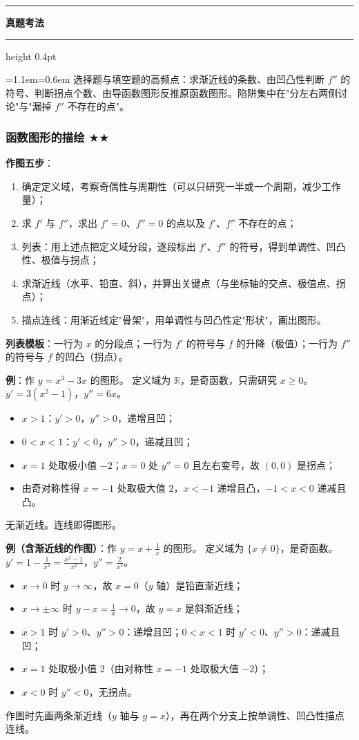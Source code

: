 \documentclass[11pt,openany,UTF8]{ctexbook}
\newcommand{\callouthead}[2]{%
  \par\addvspace{7pt}\noindent
  {\color{#1}\rule[-0.15em]{3pt}{1.05em}}\hspace{0.5em}%
  {\bfseries\color{#1}#2}\par\nobreak\vspace{-0.35em}%
  {\color{rulesep}\hrule height 0.4pt}\nobreak\vspace{0.45em}%
  \begingroup\small\setlength{\parindent}{0pt}%
  \leftskip=1.1em\rightskip=0.6em\noindent\ignorespaces}
\newcommand{\calloutend}{\par\endgroup\addvspace{7pt}}
\newenvironment{callexam}[1]{\callouthead{exambar}{#1}}{\calloutend}
\begin{document}
\begin{callexam}{真题考法}
选择题与填空题的高频点：求渐近线的条数、由凹凸性判断 $f''$ 的符号、判断拐点个数、由导函数图形反推原函数图形。陷阱集中在"分左右两侧讨论"与"漏掉 $f''$ 不存在的点"。

\end{callexam}

\subsubsection{函数图形的描绘 $\bigstar$$\bigstar$}

\textbf{作图五步}：

\begin{enumerate}
\item 确定定义域，考察奇偶性与周期性（可以只研究一半或一个周期，减少工作量）；
\item 求 $f'$ 与 $f''$，求出 $f'=0$、$f''=0$ 的点以及 $f'$、$f''$ 不存在的点；
\item 列表：用上述点把定义域分段，逐段标出 $f'$、$f''$ 的符号，得到单调性、凹凸性、极值与拐点；
\item 求渐近线（水平、铅直、斜），并算出关键点（与坐标轴的交点、极值点、拐点）；
\item 描点连线：用渐近线定"骨架"，用单调性与凹凸性定"形状"，画出图形。
\end{enumerate}
\textbf{列表模板}：一行为 $x$ 的分段点；一行为 $f'$ 的符号与 $f$ 的升降（极值）；一行为 $f''$ 的符号与 $f$ 的凹凸（拐点）。

\textbf{例}：作 $y=x^3-3x$ 的图形。 定义域为 $\mathbb R$，是奇函数，只需研究 $x\ge0$。$y'=3(x^2-1)$，$y''=6x$。

\begin{itemize}
\item $x>1$：$y'>0$，$y''>0$，递增且凹；
\item $0<x<1$：$y'<0$，$y''>0$，递减且凹；
\item $x=1$ 处取极小值 $-2$；$x=0$ 处 $y''=0$ 且左右变号，故 $(0,0)$ 是拐点；
\item 由奇对称性得 $x=-1$ 处取极大值 $2$，$x<-1$ 递增且凸，$-1<x<0$ 递减且凸。
\end{itemize}
无渐近线。连线即得图形。

\textbf{例（含渐近线的作图）}：作 $y=x+\frac1x$ 的图形。 定义域为 $\{x\ne0\}$，是奇函数。$y'=1-\frac{1}{x^2}=\frac{x^2-1}{x^2}$，$y''=\frac{2}{x^3}$。

\begin{itemize}
\item $x\to0$ 时 $y\to\infty$，故 $x=0$（$y$ 轴）是铅直渐近线；
\item $x\to\pm\infty$ 时 $y-x=\frac1x\to0$，故 $y=x$ 是斜渐近线；
\item $x>1$ 时 $y'>0$、$y''>0$：递增且凹；$0<x<1$ 时 $y'<0$、$y''>0$：递减且凹；
\item $x=1$ 处取极小值 $2$（由对称性 $x=-1$ 处取极大值 $-2$）；
\item $x<0$ 时 $y''<0$，无拐点。
\end{itemize}
作图时先画两条渐近线（$y$ 轴与 $y=x$），再在两个分支上按单调性、凹凸性描点连线。
\end{document}
